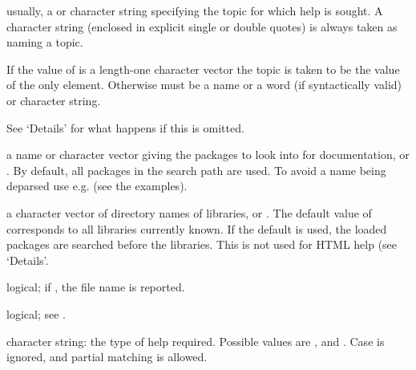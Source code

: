 \begin{Arguments}
\begin{ldescription}
\item[\code{topic}] usually, a  or character string specifying the
topic for which help is sought.  A character string (enclosed in
explicit single or double quotes) is always taken as naming a topic.

If the value of  is a length-one
character vector the topic is taken to be the value of the only
element.  Otherwise  must be a name or a 
word (if syntactically valid) or character string.

See `Details' for what happens if this is omitted.

\item[\code{package}] a name or character vector giving the packages to look
into for documentation, or .  By default, all packages in
the search path are used.  To avoid a name being deparsed use e.g.
 (see the examples).
\item[\code{lib.loc}] a character vector of directory names of \R{} libraries,
or .  The default value of  corresponds to all
libraries currently known.  If the default is used, the loaded
packages are searched before the libraries.  This is not used for
HTML help (see `Details'.
\item[\code{verbose}] logical; if , the file name is reported.
\item[\code{try.all.packages}] logical; see .
\item[\code{help\_type}] character string: the type of help required.
Possible values are ,  and .
Case is ignored, and partial matching is allowed.
\end{ldescription}
\end{Arguments}
%
